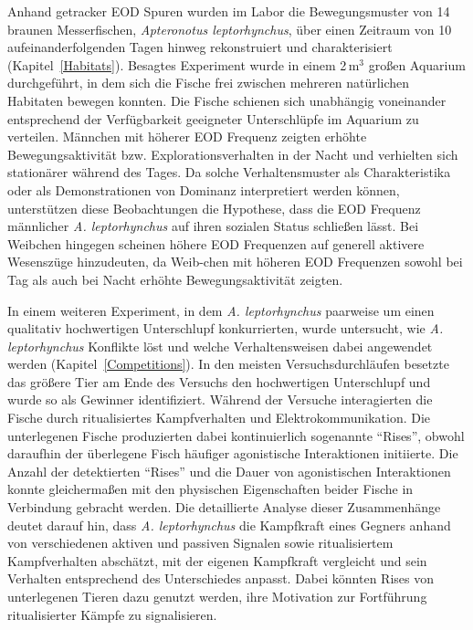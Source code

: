\documentclass[11pt,pdftex,]{book}
\newcommand{\Lepto}{\textit{Apteronotus leptorhynchus}}
\newcommand{\lepto}{\textit{A. leptorhynchus}}
\begin{document}
Anhand getracker EOD Spuren wurden im Labor die Bewegungsmuster von 14 braunen Messerfischen, \Lepto{}, über einen Zeitraum von 10 aufeinanderfolgenden Tagen hinweg rekonstruiert und charakterisiert (Kapitel~\ref{Habitats}). Besagtes Experiment wurde in einem 2\,m$^3$ großen Aquarium durchgeführt, in dem sich die Fische frei zwischen mehreren natürlichen Habitaten bewegen konnten. Die Fische schienen sich unabhängig voneinander entsprechend der Verfügbarkeit geeigneter Unterschlüpfe im Aquarium zu verteilen. Männchen mit höherer EOD Frequenz zeigten erhöhte Bewegungsaktivität bzw. Explorationsverhalten in der Nacht und verhielten sich stationärer während des Tages. Da solche Verhaltensmuster als Charakteristika oder als Demonstrationen von Dominanz interpretiert werden können, unterstützen diese Beobachtungen die Hypothese, dass die EOD Frequenz männlicher \lepto{} auf ihren sozialen Status schließen lässt. Bei Weibchen hingegen scheinen höhere EOD Frequenzen auf generell aktivere Wesenszüge hinzudeuten, da Weib-chen mit höheren EOD Frequenzen sowohl bei Tag als auch bei Nacht erhöhte Bewegungsaktivität zeigten.

In einem weiteren Experiment, in dem \lepto{} paarweise um einen qualitativ hochwertigen Unterschlupf konkurrierten, wurde untersucht, wie \lepto{} Konflikte löst und welche Verhaltensweisen dabei angewendet werden (Kapitel~\ref{Competitions}). In den meisten Versuchsdurchläufen besetzte das größere Tier am Ende des Versuchs den hochwertigen Unterschlupf und wurde so als Gewinner identifiziert. Während der Versuche interagierten die Fische durch ritualisiertes Kampfverhalten und Elektrokommunikation. Die unterlegenen Fische produzierten dabei kontinuierlich sogenannte ``Rises'', obwohl daraufhin der überlegene Fisch häufiger agonistische Interaktionen initiierte. Die Anzahl der detektierten ``Rises'' und die Dauer von agonistischen Interaktionen konnte gleichermaßen mit den physischen Eigenschaften beider Fische in Verbindung gebracht werden. Die detaillierte Analyse dieser Zusammenhänge deutet darauf hin, dass \lepto{} die Kampfkraft eines Gegners anhand von verschiedenen aktiven und passiven Signalen sowie ritualisiertem Kampfverhalten abschätzt, mit der eigenen Kampfkraft vergleicht und sein Verhalten entsprechend des Unterschiedes anpasst. Dabei könnten Rises von unterlegenen Tieren dazu genutzt werden, ihre Motivation zur Fortführung ritualisierter Kämpfe zu signalisieren.
\end{document}
